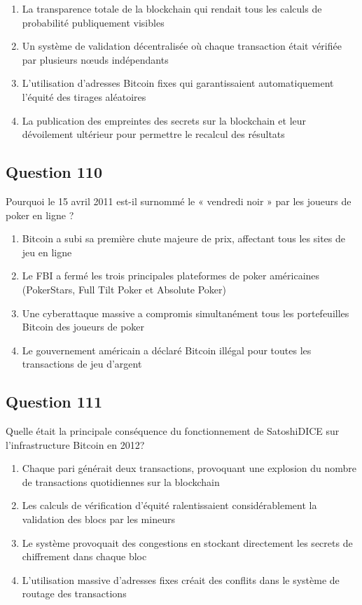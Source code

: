 \documentclass[12pt,a4paper]{article}
\begin{document}
\begin{enumerate}[label=\Alph*., leftmargin=*]
\item La transparence totale de la blockchain qui rendait tous les calculs de probabilité publiquement visibles
\item Un système de validation décentralisée où chaque transaction était vérifiée par plusieurs nœuds indépendants
\item L'utilisation d'adresses Bitcoin fixes qui garantissaient automatiquement l'équité des tirages aléatoires
\item La publication des empreintes des secrets sur la blockchain et leur dévoilement ultérieur pour permettre le recalcul des résultats
\end{enumerate}

\bigskip


\subsection*{Question 110}
Pourquoi le 15 avril 2011 est-il surnommé le « vendredi noir » par les joueurs de poker en ligne ?

\begin{enumerate}[label=\Alph*., leftmargin=*]
\item Bitcoin a subi sa première chute majeure de prix, affectant tous les sites de jeu en ligne
\item Le FBI a fermé les trois principales plateformes de poker américaines (PokerStars, Full Tilt Poker et Absolute Poker)
\item Une cyberattaque massive a compromis simultanément tous les portefeuilles Bitcoin des joueurs de poker
\item Le gouvernement américain a déclaré Bitcoin illégal pour toutes les transactions de jeu d'argent
\end{enumerate}

\bigskip


\subsection*{Question 111}
Quelle était la principale conséquence du fonctionnement de SatoshiDICE sur l'infrastructure Bitcoin en 2012?

\begin{enumerate}[label=\Alph*., leftmargin=*]
\item Chaque pari générait deux transactions, provoquant une explosion du nombre de transactions quotidiennes sur la blockchain
\item Les calculs de vérification d'équité ralentissaient considérablement la validation des blocs par les mineurs
\item Le système provoquait des congestions en stockant directement les secrets de chiffrement dans chaque bloc
\item L'utilisation massive d'adresses fixes créait des conflits dans le système de routage des transactions
\end{enumerate}
\end{document}
